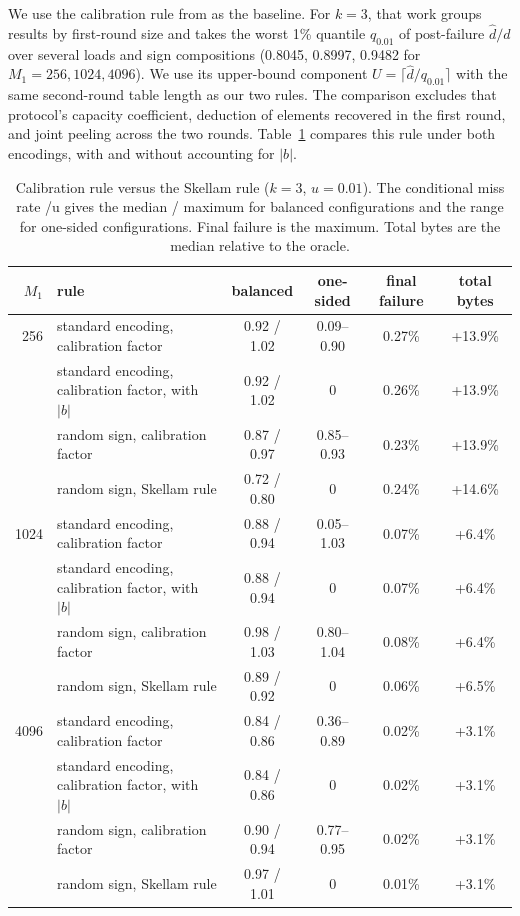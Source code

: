 We use the calibration rule from \cite{wu2026selfsizing} as the baseline. For $k=3$, that work groups results by first-round size and takes the worst 1\% quantile $q_{0.01}$ of post-failure $\widehat d/d$ over several loads and sign compositions (0.8045, 0.8997, 0.9482 for $M_1=256,1024,4096$). We use its upper-bound component $U=\lceil\widehat d/q_{0.01}\rceil$ with the same second-round table length as our two rules. The comparison excludes that protocol's capacity coefficient, deduction of elements recovered in the first round, and joint peeling across the two rounds. Table~\ref{tab:vldb} compares this rule under both encodings, with and without accounting for $|b|$.

\begin{table}[!htbp]
\centering
\caption{Calibration rule versus the Skellam rule ($k=3$, $u=0.01$). The conditional miss rate /u gives the median / maximum for balanced configurations and the range for one-sided configurations. Final failure is the maximum. Total bytes are the median relative to the oracle.}
\label{tab:vldb}
\small
\begin{tabular}{@{}rlcccc@{}}
\toprule
$M_1$ & rule & balanced & one-sided & final failure & total bytes\\
\midrule
256 & standard encoding, calibration factor & 0.92 / 1.02 & 0.09--0.90 & 0.27\% & +13.9\%\\
& standard encoding, calibration factor, with $|b|$ & 0.92 / 1.02 & 0 & 0.26\% & +13.9\%\\
& random sign, calibration factor & 0.87 / 0.97 & 0.85--0.93 & 0.23\% & +13.9\%\\
& random sign, Skellam rule & 0.72 / 0.80 & 0 & 0.24\% & +14.6\%\\
1024 & standard encoding, calibration factor & 0.88 / 0.94 & 0.05--1.03 & 0.07\% & +6.4\%\\
& standard encoding, calibration factor, with $|b|$ & 0.88 / 0.94 & 0 & 0.07\% & +6.4\%\\
& random sign, calibration factor & 0.98 / 1.03 & 0.80--1.04 & 0.08\% & +6.4\%\\
& random sign, Skellam rule & 0.89 / 0.92 & 0 & 0.06\% & +6.5\%\\
4096 & standard encoding, calibration factor & 0.84 / 0.86 & 0.36--0.89 & 0.02\% & +3.1\%\\
& standard encoding, calibration factor, with $|b|$ & 0.84 / 0.86 & 0 & 0.02\% & +3.1\%\\
& random sign, calibration factor & 0.90 / 0.94 & 0.77--0.95 & 0.02\% & +3.1\%\\
& random sign, Skellam rule & 0.97 / 1.01 & 0 & 0.01\% & +3.1\%\\
\bottomrule
\end{tabular}
\end{table}

